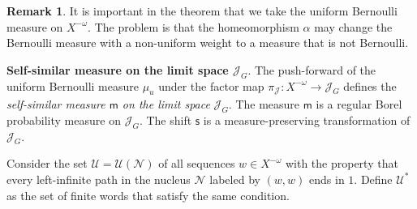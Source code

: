 \documentclass[12pt]{article}
\newcommand{\xmo}{X^{-\omega}}
\newcommand{\lims}[1][G]{\mathscr{J}_{#1}}
\newcommand{\si}{\mathsf{s}}
\newcommand{\muls}{\mathsf{m}}
\newcommand{\nucl}{\mathcal{N}}
\theoremstyle{definition}
\newtheorem{remark}{Remark}
\begin{document}
\begin{remark}
It is important in the theorem that we take the uniform Bernoulli measure on $\xmo$. The problem is
that the homeomorphism $\alpha$ may change the Bernoulli measure with a non-uniform weight to a
measure that is not Bernoulli.
\end{remark}


\vspace{0.3cm}\noindent\textbf{Self-similar measure on the limit space $\lims$}. The push-forward
of the uniform Bernoulli measure $\mu_u$ under the factor map $\pi_{\lims[]}:\xmo\rightarrow\lims$
defines the \textit{self-similar measure $\muls$ on the limit space} $\lims$. The measure $\muls$
is a regular Borel probability measure on $\lims$. The shift $\si$ is a measure-preserving
transformation of $\lims$.

Consider the set $\mathcal{U}=\mathcal{U}(\nucl)$ of all sequences $w\in\xmo$ with the property
that every left-infinite path in the nucleus $\nucl$ labeled by $(w,w)$ ends in $1$. Define
$\mathcal{U}^*$ as the set of finite words that satisfy the same condition.
\end{document}
